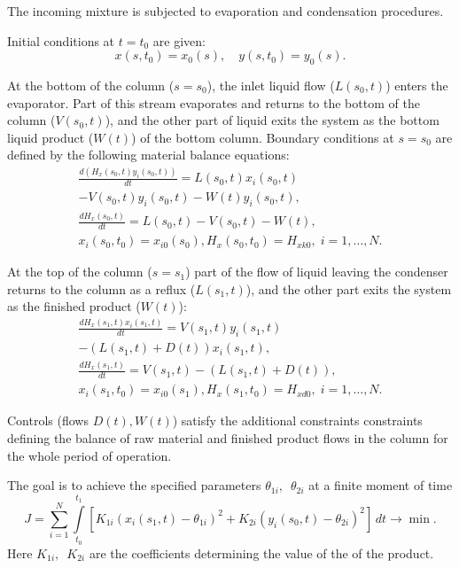 \documentclass[12pt]{llncs}
\begin{document}
The incoming mixture is subjected to evaporation and condensation procedures.

Initial conditions at $t=t_0$ are given:
\begin{equation*}
    x(s, t_0) = x_0(s),\quad y(s, t_0) = y_0(s).
\end{equation*}


At the bottom of the column ($s=s_0$), the inlet liquid flow ($L(s_0,t)$) enters the evaporator. Part of this stream evaporates and returns to the bottom of the column ($V(s_0,t)$), and the other part of liquid exits the system as the bottom liquid product ($W(t)$) of the bottom column. Boundary conditions at $s=s_0$ are defined by the following material balance equations:
\begin{multline*}
    \frac{d(H_{x}(s_0, t)y_{i}(s_0, t))}{dt} = L(s_0, t)x_i(s_0, t) \\
    -V(s_0, t)y_i(s_0, t) - W(t)y_{i}(s_0, t), \\
    \frac{dH_{x}(s_0, t)}{dt} = L(s_0, t)-V(s_0, t) - W(t),\\
    x_{i}(s_0, t_0) = x_{i0}(s_0), H_{x}(s_0, t_0) = H_{xk0},  \; i=1, \dots, N.
\end{multline*}

At the top of the column ($s=s_1$) part of the flow of liquid leaving the condenser returns to the column as a reflux ($L(s_1,t)$), and the other part exits the system as the finished product ($W(t)$):
\begin{multline*}
    \frac{dH_{x}(s_1, t)x_{i}(s_1, t)}{dt} = V(s_1, t)y_{i}(s_1, t) \\
    - (L(s_1, t)+D(t))x_{i}(s_1, t), \\
    \frac{dH_{x}(s_1, t)}{dt} = V(s_1, t) - (L(s_1, t)+D(t)),\\ x_{i}(s_1, t_0) = x_{i0}(s_1), H_{x}(s_1, t_0) = H_{xd0}, \;
     i=1, \dots, N.
\end{multline*}

Controls (flows $D(t), W(t)$) satisfy the additional constraints
constraints defining the balance of raw material and finished product flows in the column for the whole period of operation.

The goal is to achieve the specified parameters $\theta_{1i},\;\
\theta_{2i}$ at a finite moment of time 
\begin{equation*}
J=\sum\limits_{i=1}^{N}\int\limits_{t_0}^{t_1}[K_{1i}(x_{i}(s_1,t)-
\theta_{1i})^2+K_{2i}(y_{i}(s_0,t)-\theta_{2i})^2]\,dt\rightarrow
\min. 
\end{equation*}
Here $K_{1i},\;\ K_{2i}$ are the coefficients determining the value of the
of the product.
\end{document}
